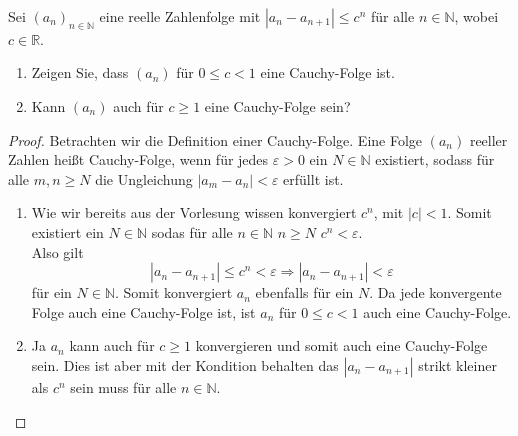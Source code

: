 \documentclass{../problemset}
\begin{document}
\pagebreak

\begin{problem}
Sei $(a_n)_{n\in\mathbb{N}}$ eine reelle Zahlenfolge mit $|a_n - a_{n+1}| \leq c^n$ für alle $n \in \mathbb{N}$, wobei $c \in \mathbb{R}$.
\begin{enumerate}
	\item Zeigen Sie, dass $(a_n)$ für $0 \leq c < 1$ eine Cauchy-Folge ist.
	\item Kann $(a_n)$ auch für $c \geq 1$ eine Cauchy-Folge sein?
\end{enumerate}
\begin{proof}
	Betrachten wir die Definition einer Cauchy-Folge.
	Eine Folge $(a_n)$ reeller Zahlen heißt Cauchy-Folge, wenn für jedes $\varepsilon > 0$ ein $N \in \mathbb{N}$ existiert,
	sodass für alle $m, n \geq N$ die Ungleichung $|a_m - a_n| < \varepsilon$ erfüllt ist.

	\begin{enumerate}
		\item Wie wir bereits aus der Vorlesung wissen konvergiert $c^n$, mit $|c| < 1$.
		      Somit existiert ein $N \in \mathbb{N}$ sodas für alle $n \in \mathbb{N}$ $n \ge N$ $c^n < \varepsilon$. \\
		      Also gilt \[
			      |a_n - a_{n+1}| \leq c^n < \varepsilon \Longrightarrow |a_n - a_{n+1}| < \varepsilon
		      \] für ein $N \in \mathbb{N}$. Somit konvergiert $a_n$ ebenfalls für ein $N$.
		      Da jede konvergente Folge auch eine Cauchy-Folge ist, ist $a_n$ für $0 \leq c < 1$ auch eine Cauchy-Folge.
		\item Ja $a_n$ kann auch für $c \ge 1$ konvergieren und somit auch eine Cauchy-Folge sein.
		      Dies ist aber mit der Kondition behalten das $|a_n - a_{n+1}|$ strikt kleiner als $c^n$ sein muss für alle $n \in \mathbb{N}$.
	\end{enumerate}
\end{proof}

\end{problem}

\pagebreak
\end{document}
